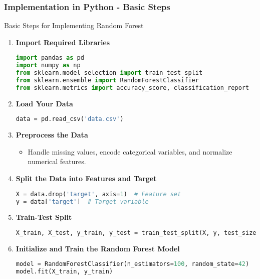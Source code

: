 \documentclass[aspectratio=169]{beamer}
\begin{document}
\begin{frame}[fragile]
    \frametitle{Implementation in Python - Basic Steps}
    \begin{block}{Basic Steps for Implementing Random Forest}
        \begin{enumerate}
            \item \textbf{Import Required Libraries}
            \begin{lstlisting}[language=Python]
import pandas as pd
import numpy as np
from sklearn.model_selection import train_test_split
from sklearn.ensemble import RandomForestClassifier
from sklearn.metrics import accuracy_score, classification_report
            \end{lstlisting}

            \item \textbf{Load Your Data}
            \begin{lstlisting}[language=Python]
data = pd.read_csv('data.csv')
            \end{lstlisting}

            \item \textbf{Preprocess the Data}
            \begin{itemize}
                \item Handle missing values, encode categorical variables, and normalize numerical features.
            \end{itemize}

            \item \textbf{Split the Data into Features and Target}
            \begin{lstlisting}[language=Python]
X = data.drop('target', axis=1)  # Feature set
y = data['target']  # Target variable
            \end{lstlisting}

            \item \textbf{Train-Test Split}
            \begin{lstlisting}[language=Python]
X_train, X_test, y_train, y_test = train_test_split(X, y, test_size=0.2, random_state=42)
            \end{lstlisting}

            \item \textbf{Initialize and Train the Random Forest Model}
            \begin{lstlisting}[language=Python]
model = RandomForestClassifier(n_estimators=100, random_state=42)
model.fit(X_train, y_train)
            \end{lstlisting}


\end{enumerate}
\end{block}
\end{frame}
\end{document}
